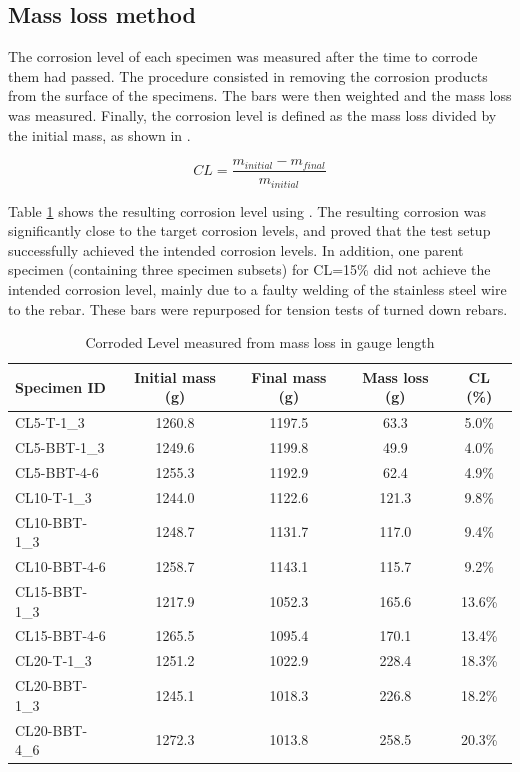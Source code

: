 \subsection{Mass loss method}

The corrosion level of each specimen was measured after the time to corrode them had passed. The procedure consisted in removing the corrosion products from the surface of the specimens. The bars were then weighted and the mass loss was measured. Finally, the corrosion level is defined as the mass loss divided by the initial mass, as shown in .

\begin{equation}
    CL=\frac{m_{initial}-m_{final}}{m_{initial}}
    \label{eq:mass_loss_CL}
\end{equation}

Table \ref{tab:CL_mass_loss_method} shows the resulting corrosion level using . The resulting corrosion was significantly close to the target corrosion levels, and proved that the test setup successfully achieved the intended corrosion levels. In addition, one parent specimen (containing three specimen subsets) for CL=15\% did not achieve the intended corrosion level, mainly due to a faulty welding of the stainless steel wire to the rebar. These bars were repurposed for tension tests of turned down rebars.

\begin{table}[]
\caption{Corroded Level measured from mass loss in gauge length}
\label{tab:CL_mass_loss_method}
\begin{center}
\begin{tabular}{lcccc}
Specimen ID & Initial mass (g) & Final mass (g) & Mass loss (g) & CL (\%) \\ \hline
CL5-T-1\_3    & 1260.8           & 1197.5         & 63.3          & 5.0\%   \\
CL5-BBT-1\_3  & 1249.6           & 1199.8         & 49.9          & 4.0\%   \\
CL5-BBT-4-6   & 1255.3           & 1192.9         & 62.4          & 4.9\%   \\
CL10-T-1\_3   & 1244.0           & 1122.6         & 121.3         & 9.8\%   \\
CL10-BBT-1\_3 & 1248.7           & 1131.7         & 117.0         & 9.4\%   \\
CL10-BBT-4-6  & 1258.7           & 1143.1         & 115.7         & 9.2\%   \\
CL15-BBT-1\_3 & 1217.9           & 1052.3         & 165.6         & 13.6\%  \\
CL15-BBT-4-6  & 1265.5           & 1095.4         & 170.1         & 13.4\%  \\
CL20-T-1\_3   & 1251.2           & 1022.9         & 228.4         & 18.3\%  \\
CL20-BBT-1\_3 & 1245.1           & 1018.3         & 226.8         & 18.2\%  \\
CL20-BBT-4\_6  & 1272.3           & 1013.8         & 258.5         & 20.3\% 
\end{tabular}
\end{center}
\end{table}

